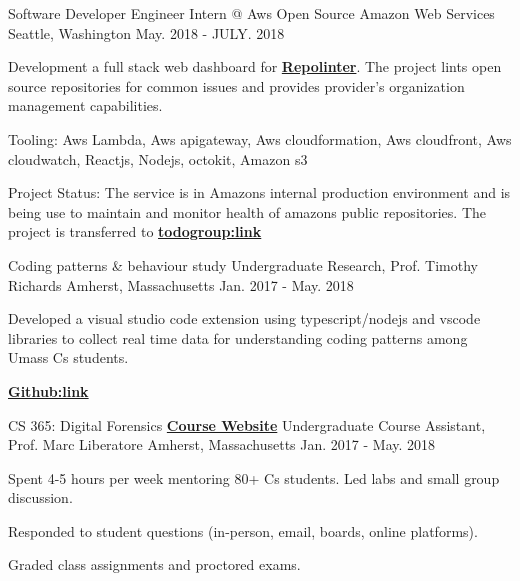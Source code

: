 \begin{cventries}
  \cventry
    {Software Developer Engineer Intern @ Aws Open Source}
    {Amazon Web Services}
    {Seattle, Washington}
    {May. 2018 - JULY. 2018}
    {
      \begin{cvitems}
        \item {Development a full stack web dashboard for \textbf{\href{https://github.com/Ab-hay/typeScriptExtension}{Repolinter}}. The project lints open source repositories for common
        issues and provides provider's organization management capabilities.}
        \item {Tooling: Aws Lambda, Aws apigateway, Aws cloudformation, Aws cloudfront, Aws cloudwatch, Reactjs, Nodejs, octokit, Amazon s3}
        \item {Project Status: The service is in Amazons internal production environment and is being use to maintain and monitor health of amazons public repositories. The project is transferred to \textbf{{\href{https://github.com/todogroup/repolinter-dashboard}{todogroup:link}}
        }  }
      \end{cvitems}
    }
  \cventry
    {Coding patterns \& behaviour study}
    {Undergraduate Research, Prof. Timothy Richards}
    {Amherst, Massachusetts}
    {Jan. 2017 - May. 2018}
    {
      \begin{cvitems}
        \item {Developed a visual studio code extension using typescript/nodejs and vscode libraries to collect real time data for understanding coding patterns among Umass Cs students.}
        \item {\textbf{\href{https://github.com/Ab-hay/typeScriptExtension}{Github:link}}}
      \end{cvitems}
    }
  \cventry
    {CS 365: Digital Forensics \textbf{\href{https://people.cs.umass.edu/~liberato/courses/2018-spring-compsci365+590f/syllabus#what-when-where-who}{ Course Website}
    }}
    {Undergraduate Course Assistant, Prof. Marc Liberatore}
    {Amherst, Massachusetts}
    {Jan. 2017 - May. 2018}
    {
      \begin{cvitems}
        \item{Spent 4-5 hours per week mentoring 80+ Cs students. Led labs and small group discussion.}
        \item {Responded to student questions (in-person, email, boards, online platforms).}
        \item{
        Graded class assignments and proctored exams. 
        }

\end{cvitems}}
\end{cventries}
